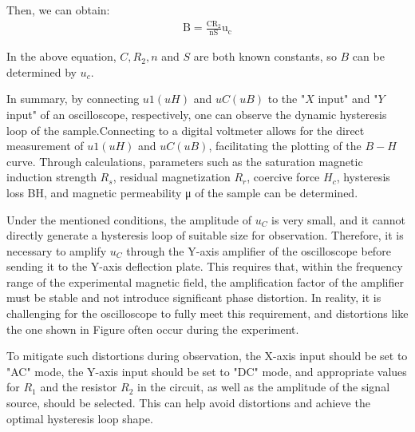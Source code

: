 \documentclass[UTF8]{article}
\begin{document}
    Then, we can obtain:
    \begin{eqnarray}
    \mathrm{B}=\frac{\mathrm{CR}_{2}}{\mathrm{nS}} \mathrm{u}_{\mathrm{c}}
    \end{eqnarray}
    
    In the above equation, $C, R_2, n$ and $S$ are both known constants, so $B$ can be determined by $u_c$.
    
     In summary, by connecting $u1 (uH)$ and $uC (uB)$ to the "$X$ input" and "$Y$ input" of an oscilloscope, respectively, one can observe the dynamic hysteresis loop of the sample.Connecting to a digital voltmeter allows for the direct measurement of $u1(uH)$ and $uC(uB)$, facilitating the plotting of the $B-H$ curve. Through calculations, parameters such as the saturation magnetic induction strength $R_s$, residual magnetization $R_r$, coercive force $H_c$, hysteresis loss BH, and magnetic permeability μ of the sample can be determined.
     
     Under the mentioned conditions, the amplitude of $u_C$ is very small, and it cannot directly generate a hysteresis loop of suitable size for observation. Therefore, it is necessary to amplify $u_C$ through the Y-axis amplifier of the oscilloscope before sending it to the Y-axis deflection plate. This requires that, within the frequency range of the experimental magnetic field, the amplification factor of the amplifier must be stable and not introduce significant phase distortion. In reality, it is challenging for the oscilloscope to fully meet this requirement, and distortions like the one shown in Figure often occur during the experiment.
     
     To mitigate such distortions during observation, the X-axis input should be set to "AC" mode, the Y-axis input should be set to "DC" mode, and appropriate values for $R_1$ and the resistor $R_2$ in the circuit, as well as the amplitude of the signal source, should be selected. This can help avoid distortions and achieve the optimal hysteresis loop shape.
    
\end{document}
